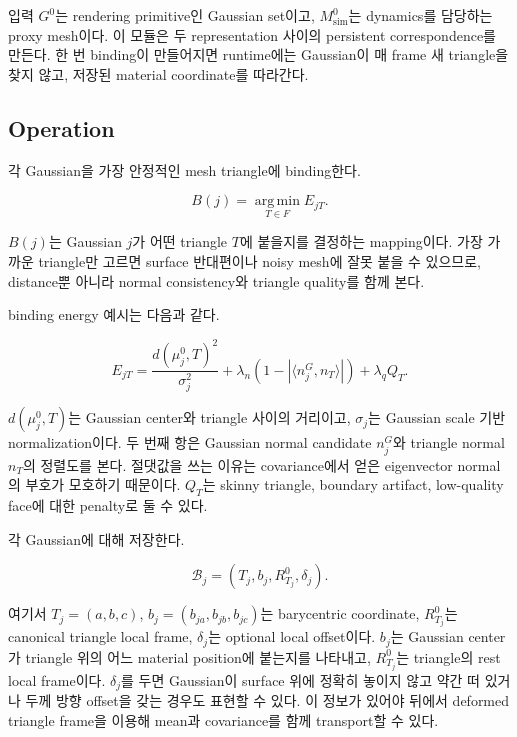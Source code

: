 \documentclass[11pt,a4paper]{article}
\newcommand{\argmin}{\operatorname*{arg\,min}}
\begin{document}
입력 $G^0$는 rendering primitive인 Gaussian set이고, $M_{\mathrm{sim}}^0$는 dynamics를 담당하는 proxy mesh이다.
이 모듈은 두 representation 사이의 persistent correspondence를 만든다.
한 번 binding이 만들어지면 runtime에는 Gaussian이 매 frame 새 triangle을 찾지 않고, 저장된 material coordinate를 따라간다.

\subsection*{Operation}

각 Gaussian을 가장 안정적인 mesh triangle에 binding한다.

\begin{equation}
B(j)=\argmin_{T\in F}E_{jT}.
\end{equation}

$B(j)$는 Gaussian $j$가 어떤 triangle $T$에 붙을지를 결정하는 mapping이다.
가장 가까운 triangle만 고르면 surface 반대편이나 noisy mesh에 잘못 붙을 수 있으므로, distance뿐 아니라 normal consistency와 triangle quality를 함께 본다.

binding energy 예시는 다음과 같다.

\begin{equation}
E_{jT}=\frac{d(\mu_j^0,T)^2}{\sigma_j^2}+\lambda_n(1-|\langle n_j^G,n_T\rangle|)+\lambda_qQ_T.
\end{equation}

$d(\mu_j^0,T)$는 Gaussian center와 triangle 사이의 거리이고, $\sigma_j$는 Gaussian scale 기반 normalization이다.
두 번째 항은 Gaussian normal candidate $n_j^G$와 triangle normal $n_T$의 정렬도를 본다.
절댓값을 쓰는 이유는 covariance에서 얻은 eigenvector normal의 부호가 모호하기 때문이다.
$Q_T$는 skinny triangle, boundary artifact, low-quality face에 대한 penalty로 둘 수 있다.

각 Gaussian에 대해 저장한다.

\begin{equation}
\mathcal{B}_j=(T_j,b_j,R_{T_j}^0,\delta_j).
\end{equation}

여기서 $T_j=(a,b,c)$, $b_j=(b_{ja},b_{jb},b_{jc})$는 barycentric coordinate, $R_{T_j}^0$는 canonical triangle local frame, $\delta_j$는 optional local offset이다.
$b_j$는 Gaussian center가 triangle 위의 어느 material position에 붙는지를 나타내고, $R_{T_j}^0$는 triangle의 rest local frame이다.
$\delta_j$를 두면 Gaussian이 surface 위에 정확히 놓이지 않고 약간 떠 있거나 두께 방향 offset을 갖는 경우도 표현할 수 있다.
이 정보가 있어야 뒤에서 deformed triangle frame을 이용해 mean과 covariance를 함께 transport할 수 있다.
\end{document}
